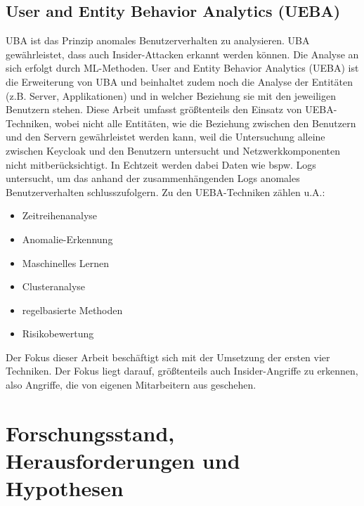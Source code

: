\documentclass[a4paper,12pt]{article}
\begin{document}
	\subsection{User and Entity Behavior Analytics (UEBA)}
	UBA ist das Prinzip anomales Benutzerverhalten zu analysieren. UBA gewährleistet, dass auch Insider-Attacken erkannt werden können. Die Analyse an sich erfolgt durch ML-Methoden\cite{Sharma2020}. User and Entity Behavior Analytics (UEBA) ist die Erweiterung von UBA und beinhaltet zudem noch die Analyse der Entitäten (z.B. Server, Applikationen) und in welcher Beziehung sie mit den jeweiligen Benutzern stehen. Diese Arbeit umfasst größtenteils den Einsatz von UEBA-Techniken, wobei nicht alle Entitäten, wie die Beziehung zwischen den Benutzern und den Servern gewährleistet werden kann, weil die Untersuchung alleine zwischen Keycloak und den Benutzern untersucht und Netzwerkkomponenten nicht mitberücksichtigt. In Echtzeit werden dabei Daten wie bspw. Logs untersucht, um das anhand der zusammenhängenden Logs anomales Benutzerverhalten schlusszufolgern. Zu den UEBA-Techniken zählen u.A.:
	
	\begin{itemize}
		\item Zeitreihenanalyse
		\item Anomalie-Erkennung
		\item Maschinelles Lernen
		\item Clusteranalyse
		\item regelbasierte Methoden
		\item Risikobewertung
	\end{itemize}
	
	Der Fokus dieser Arbeit beschäftigt sich mit der Umsetzung der ersten vier Techniken. Der Fokus liegt darauf, größtenteils auch Insider-Angriffe zu erkennen, also Angriffe, die von eigenen Mitarbeitern aus geschehen.
	
	\section{Forschungsstand, Herausforderungen und Hypothesen}
\end{document}
